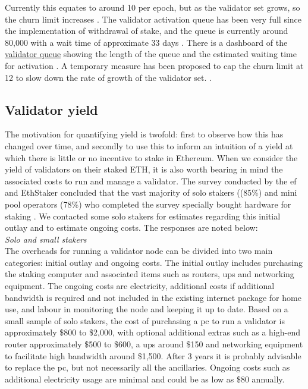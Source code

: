 \documentclass[UTF8]{article}
\begin{document}
Currently this equates to around 10 per epoch, but as the validator set grows, so the churn limit increases \cite{liquid2023}.
The validator activation queue has been very full since the implementation of withdrawal of stake, and the queue is currently around 80,000 with a wait time of approximate 33 days \cite{ea2023q}. 
There is a dashboard of the \href{https://www.validatorqueue.com/}{validator queue} showing the length of the queue and the estimated waiting time for activation \cite{ea2023q}.
A temporary measure has been proposed to cap the churn limit at 12 to slow down the rate of growth of the validator set. \cite{dapplion}.

\subsection{Validator yield}
\label{yield}
The motivation for quantifying yield is twofold: first to observe how this has changed over time, and secondly to use this to inform an intuition of a yield at which there is little or no incentive to stake in Ethereum.
When we consider the yield of validators on their staked ETH, it is also worth bearing in mind the associated costs to run and manage a validator. 
The survey conducted by the \gls{ef} and EthStaker concluded that the vast majority of solo stakers ((85\%) and mini pool operators (78\%) who completed the survey specially bought hardware for staking \cite{Smith2023}. We contacted some solo stakers for estimates regarding this initial outlay and to estimate ongoing costs. The responses are noted below: \\
\noindent
\textit{Solo and small stakers} \\
The overheads for running a validator node can be divided into two main categories: initial outlay and ongoing costs. The initial outlay includes purchasing the staking computer and associated  items such as routers, \gls{ups} and networking equipment. The ongoing costs are electricity, additional costs if additional bandwidth is required and not included in the existing internet package for home use, and labour in monitoring the node and keeping it up to date. Based on a small sample of solo stakers, the cost of purchasing a \gls{pc} to run a validator is approximately \$800 to \$2,000, with optional additional extras such as a high-end router approximately \$500 to \$600, a \gls{ups} around \$150 and networking equipment to facilitate high bandwidth around \$1,500. After 3 years it is probably advisable to replace the \gls{pc}, but not necessarily all the ancillaries. Ongoing costs such as additional electricity usage are minimal and could be as low as \$80 annually. 
\end{document}
